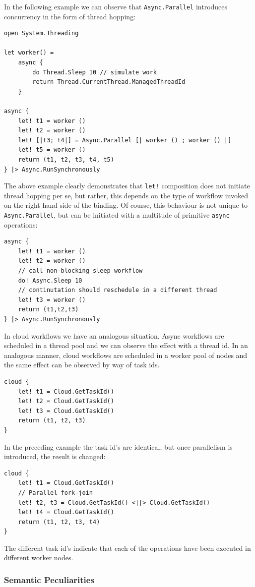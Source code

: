 \documentclass[9pt,a4paper]{article}
\begin{document}
In the following example we can observe that \texttt{Async.Parallel} introduces concurrency 
in the form of thread hopping:
\begin{lstlisting}
open System.Threading
 
let worker() = 
    async { 
        do Thread.Sleep 10 // simulate work
        return Thread.CurrentThread.ManagedThreadId 
    }
 
async {
    let! t1 = worker ()
    let! t2 = worker ()
    let! [|t3; t4|] = Async.Parallel [| worker () ; worker () |]
    let! t5 = worker ()
    return (t1, t2, t3, t4, t5)
} |> Async.RunSynchronously
\end{lstlisting}
The above example clearly demonstrates that \texttt{let!} composition does not
initiate thread hopping per se, but rather, this depends on the type of workflow
invoked on the right-hand-side of the binding. Of course, this behaviour is not
unique to \texttt{Async.Parallel}, but can be initiated with a multitude of
primitive \texttt{async} operations:
\begin{lstlisting}
async {
    let! t1 = worker ()
    let! t2 = worker ()
    // call non-blocking sleep workflow
    do! Async.Sleep 10
    // continutation should reschedule in a different thread
    let! t3 = worker ()
    return (t1,t2,t3)
} |> Async.RunSynchronously
\end{lstlisting}
In cloud workflows we have an analogous situation. Async workflows are scheduled in 
a thread pool and we can observe the effect with a thread id.
In an analogous manner, cloud workflows are scheduled in a worker pool of nodes 
and the same effect can be observed by way of task ids.
\begin{lstlisting}
cloud {
    let! t1 = Cloud.GetTaskId()
    let! t2 = Cloud.GetTaskId()
    let! t3 = Cloud.GetTaskId()
    return (t1, t2, t3)
} 
\end{lstlisting}
In the preceding example the task id's are identical, but once parallelism
is introduced, the result is changed:
\begin{lstlisting}
cloud {
    let! t1 = Cloud.GetTaskId()
    // Parallel fork-join
    let! t2, t3 = Cloud.GetTaskId() <||> Cloud.GetTaskId()
    let! t4 = Cloud.GetTaskId()
    return (t1, t2, t3, t4)
} 
\end{lstlisting}
The different task id's indicate that each of the operations have been executed
in different worker nodes.

\label{peculiarities}
\subsubsection*{Semantic Peculiarities}
\end{document}
